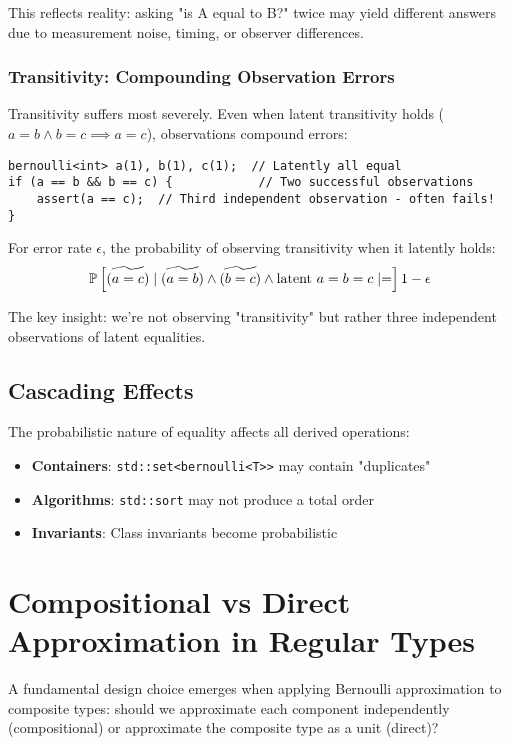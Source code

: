 \documentclass[11pt,final,hidelinks]{article}
\newcommand{\code}[1]{\texttt{#1}}
\begin{document}
This reflects reality: asking "is A equal to B?" twice may yield different answers due to measurement noise, timing, or observer differences.

\subsubsection{Transitivity: Compounding Observation Errors}

Transitivity suffers most severely. Even when latent transitivity holds ($a = b \land b = c \implies a = c$), observations compound errors:

\begin{verbatim}
bernoulli<int> a(1), b(1), c(1);  // Latently all equal
if (a == b && b == c) {            // Two successful observations
    assert(a == c);  // Third independent observation - often fails!
}
\end{verbatim}

For error rate $\epsilon$, the probability of observing transitivity when it latently holds:
\begin{equation}
\mathbb{P}\left[\widetilde{(a = c)} \mid \widetilde{(a = b)} \land \widetilde{(b = c)} \land \text{latent } a = b = c \mid =\right] 1 - \epsilon
\end{equation}

The key insight: we're not observing "transitivity" but rather three independent observations of latent equalities.

\subsection{Cascading Effects}

The probabilistic nature of equality affects all derived operations:

\begin{itemize}
    \item \textbf{Containers}: \code{std::set<bernoulli<T>>} may contain "duplicates"
    \item \textbf{Algorithms}: \code{std::sort} may not produce a total order
    \item \textbf{Invariants}: Class invariants become probabilistic
\end{itemize}

\section{Compositional vs Direct Approximation in Regular Types}

A fundamental design choice emerges when applying Bernoulli approximation to composite types: should we approximate each component independently (compositional) or approximate the composite type as a unit (direct)?
\end{document}
